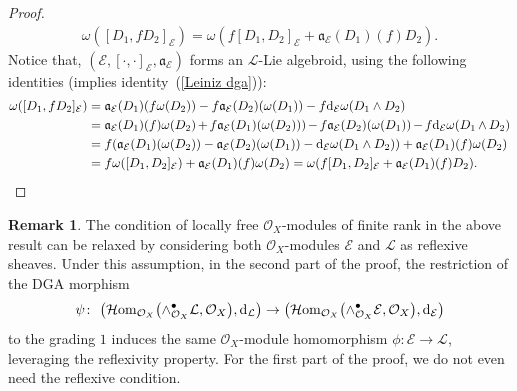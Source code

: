 \documentclass[pdftex]{sigma}
\numberwithin{equation}{section}
\theoremstyle{definition}
\newtheorem{Rem}[Thm]{Remark}
\begin{document}
\begin{proof}
	\begin{align} \label{Leiniz dga}
		\omega([D_1, f D_2]_{\mathcal{E}})= \omega(f [D_1,D_2]_{\mathcal{E}}+\mathfrak{a}_{\mathcal{E}}(D_1)(f) D_2).
	\end{align}
	Notice that, $(\mathcal{E}, [\cdot, \cdot]_{\mathcal{E}}, \mathfrak{a}_{\mathcal{E}})$ forms an $\mathcal{L}$-Lie algebroid, using the following identities (implies identity~(\ref{Leiniz dga})):
	\begin{align*}
			\omega([D_1, f D_2]_{\mathcal{E}})
			&= \mathfrak{a}_{\mathcal{E}}(D_1)(f \omega(D_2))- f \mathfrak{a}_{\mathcal{E}}(D_2)(\omega(D_1))-f {\rm d}_{\mathcal{E}}\omega (D_1 \wedge D_2)\\
			&=
			\mathfrak{a}_{\mathcal{E}}(D_1)(f) \omega(D_2)\hspace{-0.8pt}+\hspace{-0.8pt} f \mathfrak{a}_{\mathcal{E}}(D_1)(\omega(D_2)))\hspace{-0.8pt}-\hspace{-0.8pt} f \mathfrak{a}_{\mathcal{E}}(D_2)(\omega(D_1))\hspace{-0.8pt}-\hspace{-0.8pt}f {\rm d}_{\mathcal{E}}\omega (D_1 \hspace{-0.5pt}\wedge\hspace{-0.5pt} D_2)\\
			&=
			f (\mathfrak{a}_{\mathcal{E}}(D_1)(\omega(D_2))- \mathfrak{a}_{\mathcal{E}}(D_2)(\omega(D_1))-{\rm d}_{\mathcal{E}}\omega (D_1 \wedge D_2))+\mathfrak{a}_{\mathcal{E}}(D_1)(f) \omega(D_2)\\
			&=
			f \omega([D_1, D_2]_{\mathcal{E}}) + \mathfrak{a}_{\mathcal{E}}(D_1)(f) \omega(D_2)
			=\omega(f [D_1,D_2]_{\mathcal{E}}+\mathfrak{a}_{\mathcal{E}}(D_1)(f) D_2).\tag*{\qed}
	\end{align*}\renewcommand{\qed}{}	
\end{proof}
\begin{Rem} \label{dga-reflexive}
	The condition of locally free $\mathcal{O}_X$-modules of finite rank in the above result can be relaxed by considering both $\mathcal{O}_X$-modules $\mathcal{E}$ and $\mathcal{L}$ as reflexive sheaves. Under this assumption, in the second part of the proof, the restriction of the DGA morphism
\[
\psi\colon \ \bigl(\mathcal{H}{\rm om}_{\mathcal{O}_X}\bigl(\wedge^\bullet_{\mathcal{O}_X}\mathcal{L}, \mathcal{O}_X\bigr), {\rm d}_{\mathcal{L}}\bigr) \rightarrow \bigl(\mathcal{H}{\rm om}_{\mathcal{O}_X}\bigl(\wedge^\bullet_{\mathcal{O}_X}\mathcal{E}, \mathcal{O}_X\bigr), {\rm d}_{\mathcal{E}}\bigr)
\]
 to the grading $1$ induces the same $\mathcal{O}_X$-module homomorphism $\phi\colon \mathcal{E} \rightarrow \mathcal{L}$, leveraging the reflexivity property. For the first part of the proof, we do not even need the reflexive condition.
\end{Rem}
\end{document}
